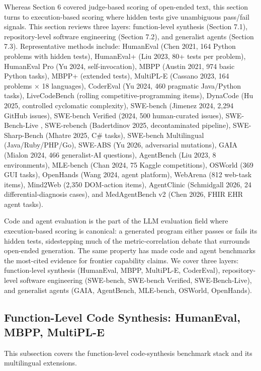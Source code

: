 \documentclass{article}
\begin{document}
Whereas Section 6 covered judge-based scoring of open-ended text, this section turns to execution-based scoring where hidden tests give unambiguous pass/fail signals. This section reviews three layers: function-level synthesis (Section 7.1), repository-level software engineering (Section 7.2), and generalist agents (Section 7.3). Representative methods include: HumanEval (Chen 2021, 164 Python problems with hidden tests), HumanEval+ (Liu 2023, 80+ tests per problem), HumanEval Pro (Yu 2024, self-invocation), MBPP (Austin 2021, 974 basic Python tasks), MBPP+ (extended tests), MultiPL-E (Cassano 2023, 164 problems × 18 languages), CoderEval (Yu 2024, 460 pragmatic Java/Python tasks), LiveCodeBench (rolling competitive-programming items), DynaCode (Hu 2025, controlled cyclomatic complexity), SWE-bench (Jimenez 2024, 2,294 GitHub issues), SWE-bench Verified (2024, 500 human-curated issues), SWE-Bench-Live \citep{zhang20252025}, SWE-rebench (Badertdinov 2025, decontaminated pipeline), SWE-Sharp-Bench (Mhatre 2025, C\# tasks), SWE-bench Multilingual (Java/Ruby/PHP/Go), SWE-ABS (Yu 2026, adversarial mutations), GAIA (Mialon 2024, 466 generalist-AI questions), AgentBench (Liu 2023, 8 environments), MLE-bench (Chan 2024, 75 Kaggle competitions), OSWorld (369 GUI tasks), OpenHands (Wang 2024, agent platform), WebArena (812 web-task items), Mind2Web (2,350 DOM-action items), AgentClinic (Schmidgall 2026, 24 differential-diagnosis cases), and MedAgentBench v2 (Chen 2026, FHIR EHR agent tasks).

Code and agent evaluation is the part of the LLM evaluation field where execution-based scoring is canonical: a generated program either passes or fails its hidden tests, sidestepping much of the metric-correlation debate that surrounds open-ended generation. The same property has made code and agent benchmarks the most-cited evidence for frontier capability claims. We cover three layers: function-level synthesis (HumanEval, MBPP, MultiPL-E, CoderEval), repository-level software engineering (SWE-bench, SWE-bench Verified, SWE-Bench-Live), and generalist agents (GAIA, AgentBench, MLE-bench, OSWorld, OpenHands).

\subsection{Function-Level Code Synthesis: HumanEval, MBPP, MultiPL-E}\label{function-level-code-synthesis-humaneval-mbpp-multipl-e}

This subsection covers the function-level code-synthesis benchmark stack and its multilingual extensions.
\end{document}
